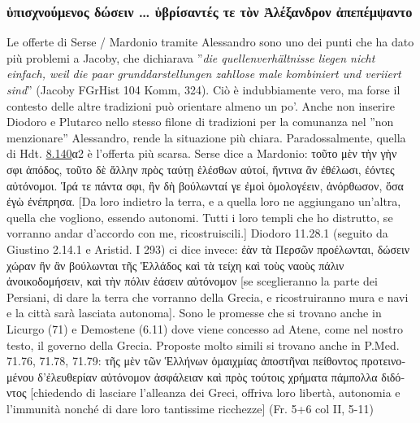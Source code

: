 {\subsubsection{\textgreek{ὑπισχνούμενος δώσειν … ὑβρίσαντές τε τὸν Ἀλέξανδρον ἀπεπέμψαντο}} 
Le offerte di Serse / Mardonio  tramite Alessandro sono uno dei punti che ha dato più problemi a Jacoby, che dichiarava ''\emph{die quellenverhältnisse liegen nicht einfach, weil die paar grunddarstellungen zahllose male kombiniert und veriiert sind}'' (Jacoby FGrHist 104 Komm, 324). Ciò è indubbiamente vero, ma forse il contesto delle altre tradizioni può orientare almeno un po'. Anche non inserire  Diodoro e Plutarco nello stesso filone di tradizioni per la comunanza nel ''non menzionare'' Alessandro, rende la situazione più chiara. Paradossalmente, quella di Hdt. \href{http://data.perseus.org/citations/urn:cts:greekLit:tlg0016.tlg001.perseus-grc1:8.140}{8.140}\textgreek{α}2  è l'offerta più scarsa. Serse dice a Mardonio: \textgreek{τοῦτο μὲν τὴν γὴν σφι ἀπόδος, τοῦτο δὲ ἄλλην πρὸς ταύτῃ ἑλέσθων αὐτοί, ἥντινα ἂν ἐθέλωσι, ἐόντες αὐτόνομοι. Ἱρά τε πάντα σφι, ἢν δὴ βούλωνταί γε ἐμοὶ ὁμολογέειν, ἀνόρθωσον, ὅσα ἐγὼ ἐνέπρησα.} [Da loro indietro la terra, e a quella loro ne aggiungano un'altra, quella che vogliono, essendo autonomi. Tutti i loro templi che ho distrutto, se vorranno andar d'accordo con me, ricostruiscili.]  Diodoro 11.28.1 (seguito da  Giustino 2.14.1 e Aristid. I 293) ci dice invece: \textgreek{ἐὰν τὰ Περσῶν προέλωνται, δώσειν χώραν ἣν ἂν βούλωνται τῆς Ἑλλάδος καὶ τὰ τείχη καὶ τοὺς ναοὺς πάλιν ἀνοικοδομήσειν, καὶ τὴν πόλιν ἐάσειν αὐτόνομον} [se sceglieranno la parte dei Persiani, di dare la terra che vorranno della Grecia, e ricostruiranno mura e navi e la città sarà lasciata autonoma].
    Sono le promesse che si trovano anche in Licurgo  (71) e Demostene (6.11) dove viene concesso ad Atene, come nel nostro testo, il governo della Grecia. Proposte molto simili si trovano anche in P.Med. 71.76, 71.78, 71.79: \textgreek{τῆς μὲν τῶν Ἑλλήνων ὁμαιχμίας ἀποστῆναι πείθοντος προτεινομένου δ’ἐλευθερίαν αὐτόνομον ἀσφάλειαν καὶ πρὸς  τούτοις  χρήματα πάμπολλα διδόντος}  [chiedendo di lasciare l'alleanza dei Greci, offriva loro libertà, autonomia e l'immunità nonché di dare loro tantissime ricchezze] (Fr. 5+6 col II, 5-11)
}

